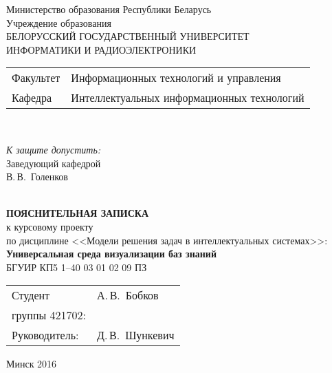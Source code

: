 \begin{titlepage}
  \begin{center}
    Министерство образования Республики Беларусь\\[1em]
    Учреждение образования\\
    БЕЛОРУССКИЙ ГОСУДАРСТВЕННЫЙ УНИВЕРСИТЕТ \\
    ИНФОРМАТИКИ И РАДИОЭЛЕКТРОНИКИ\\[1em]

    \begin{minipage}{\textwidth}
      \begin{flushleft}
        \begin{tabular}{ l l }
          Факультет & Информационных технологий и управления\\
          Кафедра   & Интеллектуальных информационных технологий
        \end{tabular}
      \end{flushleft}
    \end{minipage}\\[1em]

    \begin{minipage}{\textwidth}
      \begin{flushright}
        \textit{К защите допустить:}\\
        Заведующий кафедрой \\
        \underline{\hspace*{4.5cm}} В.\,В.~Голенков
      \end{flushright}
    \end{minipage}\\[3em]

    \textbf{ПОЯСНИТЕЛЬНАЯ ЗАПИСКА}\\
    {к курсовому проекту }\\
    {по дисциплине <<Модели решения задач в интеллектуальных системах>>:}\\[1em]
    \textbf{\large Универсальная среда визуализации баз знаний}\\[1em]


    {БГУИР КП5 1–40 03 01 02 09 ПЗ}\\[6em]
    
    
    
    \begin{tabular}{ p{}p{} }
      Студент & А.\,В.~Бобков \\
      группы 421702: \\[1em]
      Руководитель: & Д.\,В.~Шункевич \\
     
    \end{tabular}
    
    \vfill
    {\normalsize Минск 2016}
  \end{center}
\end{titlepage}
